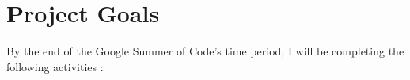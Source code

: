 \documentclass[preprint,12pt]{elsarticle}
\begin{document}



\section{Project Goals}
\label{S:1}

By the end of the Google Summer of Code's time period, I will be completing the following activities :
\end{document}
